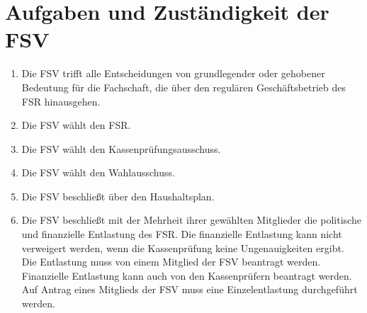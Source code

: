 \documentclass{article}
\begin{document}
\section{Aufgaben und Zuständigkeit der FSV}
\begin{enumerate}[(1)]
    \item Die FSV trifft alle Entscheidungen von grundlegender oder gehobener Bedeutung für die Fachschaft, die über den regulären Geschäftsbetrieb des FSR hinausgehen.
    \item Die FSV wählt den FSR.
	\item Die FSV wählt den Kassenprüfungsausschuss.
	\item Die FSV wählt den Wahlausschuss.
	\item Die FSV beschließt über den Haushaltsplan.
	\item Die FSV beschließt mit der Mehrheit ihrer gewählten Mitglieder die politische und finanzielle Entlastung des FSR. Die finanzielle Entlastung kann nicht verweigert werden, wenn die Kassenprüfung keine Ungenauigkeiten ergibt. Die Entlastung muss von einem Mitglied der FSV beantragt werden. Finanzielle Entlastung kann auch von den Kassenprüfern beantragt werden. Auf Antrag eines Mitglieds der FSV muss eine Einzelentlastung durchgeführt werden.
\end{enumerate}
\end{document}
